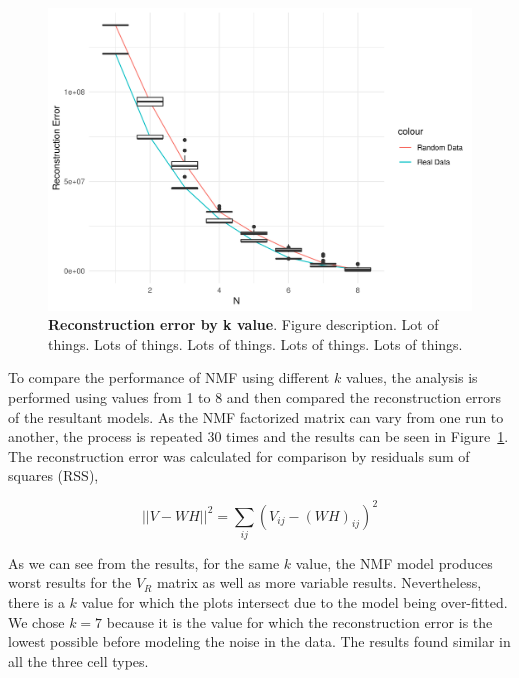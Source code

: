 \begin{figure}[h]
    \centering
    \includegraphics[width=0.7\linewidth]{Figures/select_n/error_by_n.png}
    \caption[Reconstruction error by k value]{\textbf{Reconstruction error by k value}. Figure description. Lot of things. Lots of things. Lots of things. Lots of things. Lots of things.}
    \label{fig:chooseK_error}
\end{figure}

\medskip

To compare the performance of NMF using different \(k\) values, the analysis is performed using values from 1 to 8 and then compared the reconstruction errors of the resultant models. As the NMF factorized matrix can vary from one run to another, the process is repeated 30 times and the results can be seen in Figure~\ref{fig:chooseK_error}. The reconstruction error was calculated for comparison by residuals sum of squares (RSS),

\begin{equation}
    \vert \vert V - WH \vert \vert ^ 2 = \sum_{ij} (V_{ij} - (WH)_{ij} )^2
\end{equation}

\medskip

As we can see from the results, for the same \(k\) value, the NMF model produces worst results for the \(V_R\) matrix as well as more variable results. Nevertheless, there is a \(k\) value for which the plots intersect due to the model being over-fitted. We chose \(k = 7\) because it is the value for which the reconstruction error is the lowest possible before modeling the noise in the data. The results found similar in all the three cell types.


